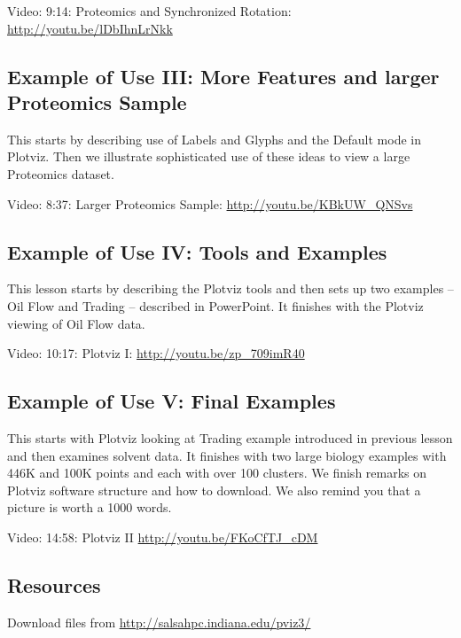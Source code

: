 Video: 9:14: Proteomics and Synchronized Rotation:
\url{http://youtu.be/lDbIhnLrNkk}

\subsection{Example of Use III: More Features and larger Proteomics
Sample}\label{example-of-use-iii-more-features-and-larger-proteomics-sample}

This starts by describing use of Labels and Glyphs and the Default mode
in Plotviz. Then we illustrate sophisticated use of these ideas to view
a large Proteomics dataset.

Video: 8:37: Larger Proteomics Sample: \url{http://youtu.be/KBkUW_QNSvs}

\subsection{Example of Use IV: Tools and
Examples}\label{example-of-use-iv-tools-and-examples}

This lesson starts by describing the Plotviz tools and then sets up two
examples -- Oil Flow and Trading -- described in PowerPoint. It finishes
with the Plotviz viewing of Oil Flow data.

Video: 10:17: Plotviz I: \url{http://youtu.be/zp_709imR40}

\subsection{Example of Use V: Final
Examples}\label{example-of-use-v-final-examples}

This starts with Plotviz looking at Trading example introduced in
previous lesson and then examines solvent data. It finishes with two
large biology examples with 446K and 100K points and each with over 100
clusters. We finish remarks on Plotviz software structure and how to
download. We also remind you that a picture is worth a 1000 words.

Video: 14:58: Plotviz II \url{http://youtu.be/FKoCfTJ_cDM}

\subsection{Resources}

Download files from \url{http://salsahpc.indiana.edu/pviz3/}
